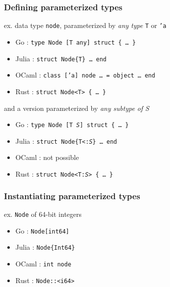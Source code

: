 \documentclass[12pt,dvipdfmx]{beamer}
\newcommand{\ao}[1]{{\color{blue}#1}}
\begin{document}
\begin{frame}[fragile]
  \frametitle{Defining parameterized types}
  ex. data type {\tt node}, parameterized by {\it any type} {\tt T} or {\tt 'a}
  \begin{itemize}
  \item Go : {\tt type Node \ao{[T any]} struct \{ \ldots\ \}}
  \item Julia : {\tt struct Node\ao{\{T\}} \ldots\ end}
  \item OCaml : {\tt class \ao{['a]} node \ldots\ = object \ldots\ end}
  \item Rust : {\tt struct Node\ao{<T>} \{ \ldots\ \}}
  \end{itemize}
  and a version parameterized by {\it any subtype of S}
  \begin{itemize}
  \item Go : {\tt type Node \ao{[T {\it S}]} struct \{ \ldots\ \}}
  \item Julia : {\tt struct Node\ao{\{T<:{\it S}\}} \ldots\ end}
  \item OCaml : not possible
  \item Rust : {\tt struct Node\ao{<T:{\it S}>} \{ \ldots\ \}}
  \end{itemize}
\end{frame}

\begin{frame}
  \frametitle{Instantiating parameterized types}
  ex. {\tt Node} of 64-bit integers
  \begin{itemize}
  \item Go : {\tt Node\ao{[int64]}}
  \item Julia : {\tt Node\ao{\{Int64\}}}
  \item OCaml : {\tt int node}
  \item Rust : {\tt Node\ao{::<i64>}}
  \end{itemize}
\end{frame}
\end{document}
